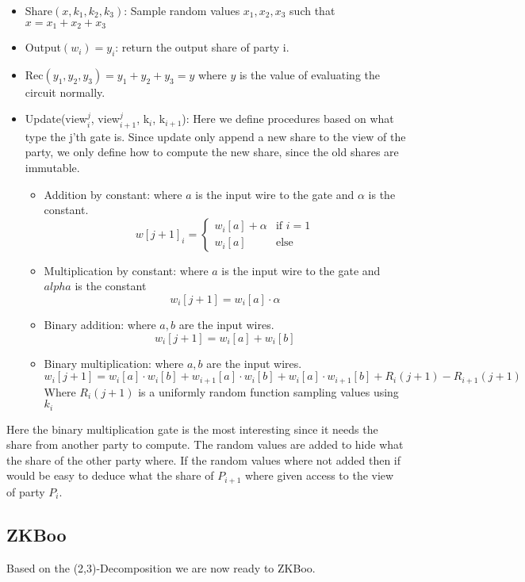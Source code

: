 \begin{itemize}
  \item Share$(x, k_{1}, k_{2}, k_{3})$: Sample random values
    $x_{1}, x_{2}, x_{3}$ such that $x = x_{1} + x_{2} + x_{3}$
  \item Output$(w_{i}) = y_{i}$: return the output share of party i.
  \item Rec$(y_{1}, y_{2}, y_{3}) = y_{1} + y_{2} + y_{3} = y$ where $y$ is the
    value of evaluating the circuit normally.
  \item Update(view$^{j}_{i}$, view$^{j}_{i+1}$, k$_{i}$, k$_{i+1}$): Here we
    define procedures based on what type the j'th gate is. Since update only
    append a new share to the view of the party, we only define how to compute
    the new share, since the old shares are immutable.
    \begin{itemize}
      \item Addition by constant: where $a$ is the input wire to the gate
        and $\alpha$ is the constant.
        $$ w[j+1]_{i} =
        \begin{cases} w_{i}[a] + \alpha & \text{if } i = 1 \\
                      w_{i}[a]          & \text{else}       %
        \end{cases}$$
      \item Multiplication by constant: where $a$ is the input wire to the gate
        and $alpha$ is the constant
        $$ w_{i}[j+1] = w_{i}[a] \cdot \alpha$$
      \item Binary addition: where $a, b$ are the input wires.
        $$
        w_{i}[j+1] = w_{i}[a] + w_{i}[b]
        $$
      \item Binary multiplication: where $a, b$ are the input wires.
        $$
        w_{i}[j+1] = w_{i}[a] \cdot w_{i}[b] + w_{i+1}[a] \cdot w_{i}[b] + w_{i}[a] \cdot w_{i+1}[b] + R_{i}(j+1) - R_{i+1}(j+1)
        $$
        Where $R_{i}(j+1)$ is a uniformly random function sampling values using $k_{i}$
    \end{itemize}
\end{itemize}

Here the binary multiplication gate is the most interesting since it needs the
share from another party to compute. The random values are added to hide what
the share of the other party where. If the random values where not added then if
would be easy to deduce what the share of $P_{i+1}$ where given access to the
view of party $P_{i}$.

\subsection{ZKBoo}
\label{subsec:general:zkboo}
Based on the (2,3)-Decomposition we are now ready to ZKBoo.

